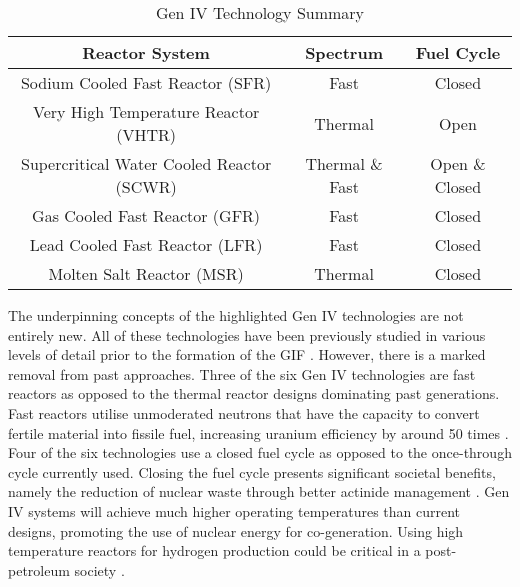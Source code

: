 \documentclass[journal]{IEEEtran}
\begin{document}
\begin{table}[!t]
\renewcommand{\arraystretch}{1.3}
\caption{Gen IV Technology Summary \cite{GenIVRoadmap, Marques2010a}}
\label{table:GenIV}
\centering
\begin{tabular}{|c|c|c|}
\hline
\textbf{Reactor System} & \textbf{Spectrum} & \textbf{Fuel Cycle}\\
\hline
Sodium Cooled Fast Reactor (SFR) & Fast & Closed \\
\hline
Very High Temperature Reactor (VHTR) & Thermal & Open \\
\hline
Supercritical Water Cooled Reactor (SCWR) & Thermal \& Fast & Open \& Closed \\
\hline
Gas Cooled Fast Reactor (GFR) & Fast & Closed \\
\hline
Lead Cooled Fast Reactor (LFR) & Fast & Closed \\
\hline
Molten Salt Reactor (MSR) & Thermal & Closed \\
\hline

\end{tabular}
\end{table}

The underpinning concepts of the highlighted Gen IV technologies are not entirely new. 
All of these technologies have been previously studied in various levels of detail prior to the formation of the GIF \cite{Marques2010a}. However, there is a marked removal from past approaches. 
Three of the six Gen IV technologies are fast reactors as opposed to the thermal reactor designs dominating past generations.
Fast reactors utilise unmoderated neutrons that have the capacity to convert fertile material into fissile fuel, increasing uranium efficiency by around 50 times \cite{Locatelli2013}. 
Four of the six technologies use a closed fuel cycle as opposed to the once-through cycle currently used. 
Closing the fuel cycle presents significant societal benefits, namely the reduction of nuclear waste through better actinide management \cite{GenIVRoadmap, Bhatnagar2011}. 
Gen IV systems will achieve much  higher operating temperatures than current designs, promoting the use of nuclear energy for co-generation. 
Using high temperature reactors for hydrogen production could be critical in a post-petroleum society \cite{ Bhatnagar2011}. 
\end{document}
